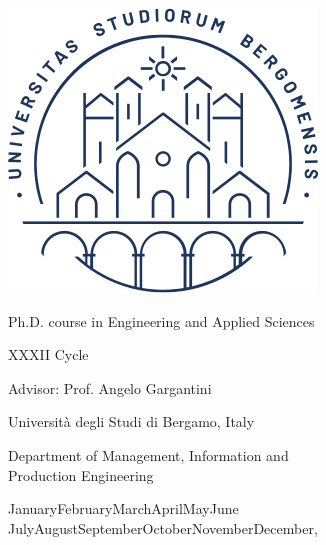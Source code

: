 \begin{titlepage}
  \begin{center}
    \includegraphics[scale=0.5]{images/sigillo.png}
    
    \vspace{1cm}
    
    
    \vspace{1cm}
    
	{\huge \bfseries \ttitle\par}\vspace{0.4cm} %
	
    \vspace{1.5cm}
    
    {\huge \authorname}
    
    \vspace{.2cm}
    
    {\large Ph.D. course in Engineering and Applied Sciences}

	XXXII Cycle
    
    \vspace{\fill}
    
    {\large Advisor: Prof. Angelo Gargantini \\}
    
   
    
    \vspace{0.3cm}
    
    \vspace{\fill}
    
    {\large Universit\`a degli Studi di Bergamo, Italy
    
   Department of Management, Information and \\Production Engineering\\}
    
    \vspace{.5cm}
    
    {\large
    	\ifcase\month\or
    	January\or February\or March\or April\or May\or June\or
    	July\or August\or September\or October\or November\or December\fi,
    	\number\year
    }
        
  \end{center}
\end{titlepage}


